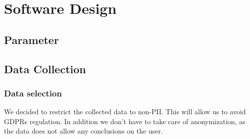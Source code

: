 \chapter{Software Design}
\label{chap:software_design}



\section{Parameter}
\label{sec:measurement:parameter}

%

\newpage


\section{Data Collection}
\label{sec:software_design:data_collection}

    \subsection{Data selection}
        \label{subsec:software_design:selection}
        We decided to restrict the collected data to non-PII. This will allow us to avoid GDPRs regulation. 
        In addition we don't have to take care of anonymization, as the data does not allow any conclusions 
        on the user.

